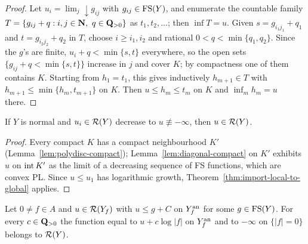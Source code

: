 \begin{proof}
Let $u_i=\lim_j\downarrow g_{ij}$ with $g_{ij}\in\mathrm{FS}(Y)$, and enumerate the countable family
$T=\{g_{ij}+q:i,j\in\N,\ q\in\Q_{>0}\}$ as $t_1,t_2,\dots$; then $\inf T=u$. Given
$s=g_{i_1j_1}+q_1$ and $t=g_{i_2j_2}+q_2$ in $T$, choose $i\ge i_1,i_2$ and rational
$0<q<\min\{q_1,q_2\}$. Since the $g$'s are finite, $u_i+q<\min\{s,t\}$ everywhere, so the open
sets $\{g_{ij}+q<\min\{s,t\}\}$ increase in $j$ and cover $K$; by compactness one of them contains
$K$. Starting from $h_1=t_1$, this gives inductively $h_{m+1}\in T$ with
$h_{m+1}\le\min\{h_m,t_{m+1}\}$ on $K$. Then $u\le h_m\le t_m$ on $K$ and $\inf_mh_m=u$ there.
\end{proof}

\begin{lemma}\label{lem:reg-decreasing}
\leanok
{}
If $Y$ is normal and $u_i\in\mathcal{R}(Y)$ decrease to $u\not\equiv-\infty$, then $u\in\mathcal{R}(Y)$.
\end{lemma}

\begin{proof}
Every compact $K$ has a compact neighbourhood $K'$ (Lemma~\ref{lem:polydisc-compact});
Lemma~\ref{lem:diagonal-compact} on $K'$ exhibits $u$ on $\operatorname{int} K'$ as the limit of a
decreasing sequence of FS functions, which are convex PL. Since $u\le u_1$ has logarithmic growth,
Theorem~\ref{thm:import-local-to-global} applies.
\end{proof}

\begin{lemma}\label{lem:principal-extension}
\leanok
{}
Let $0\ne f\in A$ and $u\in\mathcal{R}(Y_f)$ with $u\le g+C$ on $Y_f^{\mathrm{an}}$ for some $g\in\mathrm{FS}(Y)$. For
every $c\in\mathbf{Q}_{>0}$ the function equal to $u+c\log|f|$ on $Y_f^{\mathrm{an}}$ and to $-\infty$ on
$\{|f|=0\}$ belongs to $\mathcal{R}(Y)$.
\end{lemma}

